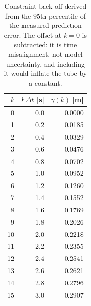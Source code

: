\begin{table}[htbp]
  \centering
  \small
  \caption{Constraint back-off derived from the $95$th percentile of the measured prediction error. The offset at $k=0$ is subtracted: it is time misalignment, not model uncertainty, and including it would inflate the tube by a constant.}
  \label{res:tab:beta}
  \begin{tabular}{rrr}
    \toprule
    $k$ & $k\,\Delta t$ [s] & $\gamma(k)$ [m] \\
    \midrule
    0 & 0.0 & 0.0000 \\
    1 & 0.2 & 0.0185 \\
    2 & 0.4 & 0.0329 \\
    3 & 0.6 & 0.0476 \\
    4 & 0.8 & 0.0702 \\
    5 & 1.0 & 0.0952 \\
    6 & 1.2 & 0.1260 \\
    7 & 1.4 & 0.1552 \\
    8 & 1.6 & 0.1769 \\
    9 & 1.8 & 0.2026 \\
    10 & 2.0 & 0.2218 \\
    11 & 2.2 & 0.2355 \\
    12 & 2.4 & 0.2541 \\
    13 & 2.6 & 0.2621 \\
    14 & 2.8 & 0.2796 \\
    15 & 3.0 & 0.2907 \\
    \bottomrule
  \end{tabular}
\end{table}

